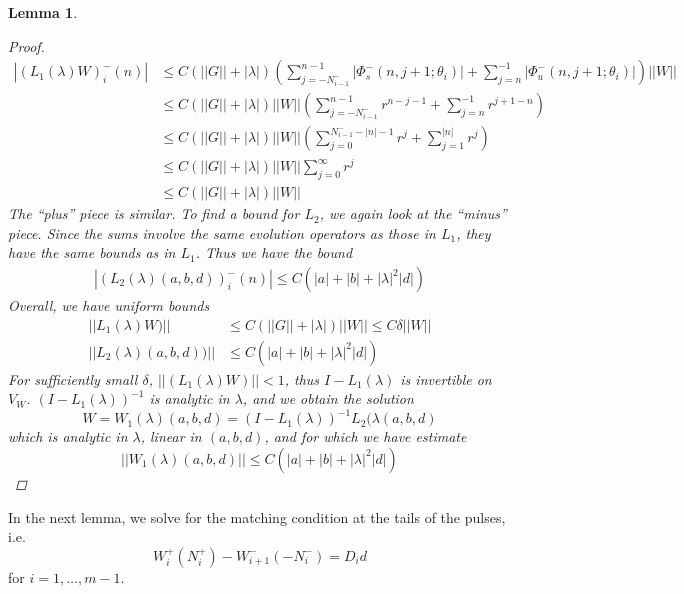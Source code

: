\documentclass[12pt]{article}
\newtheorem{lemma}{Lemma}
\begin{document}
\begin{lemma}
\begin{proof}
\begin{align*}
|(L_1(\lambda)W)_i^-(n)| &\leq C (||G|| + |\lambda|)\left(
\sum_{j = -N_{i-1}^-}^{n-1} |\Phi_s^-(n, j+1; \theta_i)| + \sum_{j = n}^{-1} |\Phi_u^-(n, j+1; \theta_i)| \right) ||W|| \\
&\leq C (||G|| + |\lambda|) ||W||
\left( \sum_{j = -N_{i-1}^-}^{n-1} r^{n - j - 1} + \sum_{j = n}^{-1} r^{j+1-n} \right) \\
&\leq C (||G|| + |\lambda|) ||W||
\left( \sum_{j = 0}^{N_{i-1}^- -|n| -1} r^j + \sum_{j = 1}^{|n|} r^j \right) \\
&\leq C (||G|| + |\lambda|) ||W||\sum_{j = 0}^\infty r^j \\
&\leq C (||G|| + |\lambda|)||W||
\end{align*}
The ``plus'' piece is similar. To find a bound for $L_2$, we again look at the ``minus'' piece. Since the sums involve the same evolution operators as those in $L_1$, they have the same bounds as in $L_1$. Thus we have the bound
\begin{align*}
|(L_2(\lambda)(a,b,d))_i^-(n)| \leq C\left( |a| + |b| + |\lambda|^2 |d| \right)
\end{align*}
Overall, we have uniform bounds
\begin{align*}
||L_1(\lambda)W)|| &\leq C \left(||G|| + |\lambda| \right)||W|| \leq C \delta ||W|| \\
||L_2(\lambda)(a,b,d))|| &\leq C\left( |a| + |b| + |\lambda|^2 |d| \right)
\end{align*}
For sufficiently small $\delta$, $||(L_1(\lambda)W)|| < 1$, thus $I - L_1(\lambda)$ is invertible on $V_W$. $(I - L_1(\lambda))^{-1}$ is analytic in $\lambda$, and we obtain the solution 
\[
W = W_1(\lambda)(a,b,d) = (I - L_1(\lambda))^{-1} L_2(\lambda(a,b,d)
\]
which is analytic in $\lambda$, linear in $(a, b, d)$, and for which we have estimate
\[
||W_1(\lambda)(a,b,d)|| \leq C \left( |a| + |b| + |\lambda|^2 |d| \right)
\]
\end{proof}
\end{lemma}

In the next lemma, we solve for the matching condition at the tails of the pulses, i.e.
\[
W_i^+(N_i^+) - W_{i+1}^-(-N_i^-) = D_i d
\]
for $i = 1, \dots, m-1$. 
\end{document}
